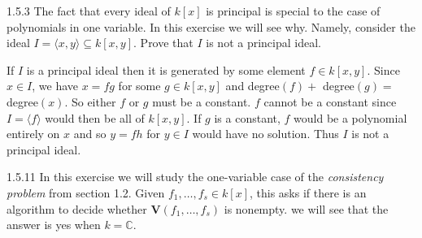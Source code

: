 \documentclass[12pt]{article}
\begin{document}
1.5.3
The fact that every ideal of $k[x]$ is principal is special to the case of polynomials in one variable. In this exercise we will see why. Namely, consider the ideal $I=\langle x,y \rangle \subseteq k[x,y]$. Prove that $I$ is not a principal ideal.
\begin{mybox}
    If $I$ is a principal ideal then it is generated by
    some element $f\in k[x,y]$. Since $x\in I$, we have
    $x=fg$ for some $g\in k[x,y]$ and degree$(f) + $
    degree$(g)=$ degree$(x)$. So either $f$ or $g$ must be a constant.
    $f$ cannot be a constant since $I=\langle f \rangle$
    would then be all of $k[x,y]$. If $g$ is a constant,
    $f$ would be a polynomial entirely on $x$ and so
    $y=fh$ for $y\in I$ would have no solution. Thus $I$
    is not a principal ideal.
\end{mybox}
1.5.11
In this exercise we will study the one-variable case of the \textit{consistency problem} from section 1.2. Given $f_1,\ldots, f_s\in k[x]$, this asks if there is an algorithm to decide whether $\mathbf{V}(f_1,\ldots,f_s)$ is nonempty. we will see that the answer is yes when $k=\mathbb{C}$.
\end{document}
